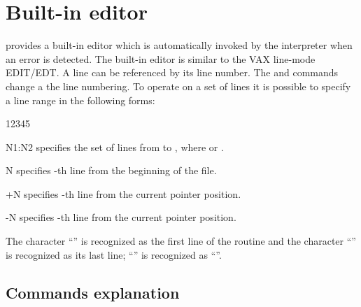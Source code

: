 
\chapter{Built-in editor}
\label{sec:comiseditor}

\COMIS{} provides a built-in editor which is automatically 
invoked by the interpreter when an error is detected. 
The \COMIS{} built-in editor is similar to the
VAX line-mode EDIT/EDT. 
A line can be referenced by its line number. 
The  and  commands change a the line numbering. 
To operate on a set of lines it is possible to specify 
a line range in the following forms:

\begin{DLtt}{12345}
\item[N1:N2]   specifies the set of lines from  to , where
                or .
\item[N]       specifies -th line from the beginning of the file.
\item[+N]      specifies -th line from the current pointer position.
\item[-N]      specifies -th line from the current pointer position.
\end{DLtt}
 
The character ``'' is recognized as the first line of the routine and
the character ``'' is recognized as its last line; ``'' is recognized
as ``''.

\section{Commands explanation}

